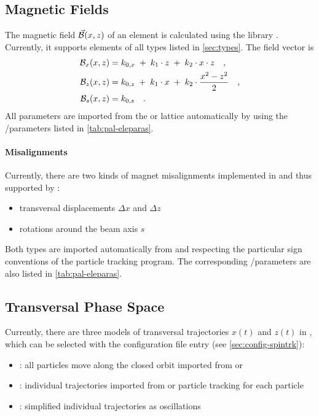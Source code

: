 \documentclass[a4paper]{scrartcl}
\begin{document}
\subsection{Magnetic Fields}
\label{sec:concept-b}
The magnetic field $\vec{\mathcal{B}}_{}(x,z)$ of an element is calculated using the library \pal.
Currently, it supports elements of all types listed in \cref{sec:types}. The field vector
is
\begin{align*}
  \mathcal{B}_x(x,z) &= k_{0,x} \;+\; k_1\cdot z \;+\; k_2\cdot x\cdot z \quad,\\
  \mathcal{B}_z(x,z) &= k_{0,z} \;+\; k_1\cdot x \;+\; k_2\cdot \frac{x^2-z^2}{2} \quad,\\
  \mathcal{B}_s(x,z) &= k_{0,s} \quad.
\end{align*}
All parameters are imported from the \ele or \madx lattice automatically by \pal using the
\ele/\madx parameters listed in \cref{tab:pal-eleparas}.

\paragraph{Misalignments}
Currently, there are two kinds of magnet misalignments implemented in \pal and thus
supported by \polem:
\begin{itemize}
\item transversal displacements $\Delta x$ and $\Delta z$
\item rotations around the beam axis $s$
\end{itemize}
Both types are imported automatically from \ele and \madx respecting the particular sign
conventions of the particle tracking program. The corresponding \ele/\madx parameters are
also listed in \cref{tab:pal-eleparas}.




\subsection{Transversal Phase Space}
\label{sec:concept-traj}
Currently, there are three models of transversal trajectories $x(t)$ and $z(t)$ in \polem,
which can be selected with the configuration file entry  (see
\cref{sec:config-spintrk}):
\begin{itemize}
\item {}: all particles move along the closed orbit imported from \ele or \madx
\item {}: individual trajectories imported from \ele or \madx particle tracking for each particle
\item {}: simplified individual trajectories as oscillations
\end{itemize}
\end{document}
